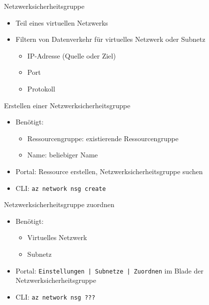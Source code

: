 
\begin{flashcard}[Definition]{Netzwerksicherheitsgruppe}
    \begin{itemize}
        \item Teil eines virtuellen Netzwerks
        \item Filtern von Datenverkehr für virtuelles Netzwerk oder Subnetz
        \begin{itemize}
            \item IP-Adresse (Quelle oder Ziel)
            \item Port
            \item Protokoll
        \end{itemize}
    \end{itemize}
\end{flashcard}

\begin{flashcard}[Definition]{Erstellen einer Netzwerksicherheitsgruppe}
    \begin{itemize}
        \item Benötigt:
            \begin{itemize}
                \item Ressourcengruppe: existierende Ressourcengruppe
                \item Name: beliebiger Name
            \end{itemize}
        \item Portal: Ressource erstellen, Netzwerksicherheitsgruppe suchen
        \item CLI: \texttt{az network nsg create}
    \end{itemize}
\end{flashcard}

\begin{flashcard}[Definition]{Netzwerksicherheitsgruppe zuordnen}
    \begin{itemize}
        \item Benötigt:
            \begin{itemize}
                \item Virtuelles Netzwerk
                \item Subnetz
            \end{itemize}
        \item Portal: \texttt{Einstellungen | Subnetze | Zuordnen} im Blade der Netzwerksicherheitsgruppe
        \item CLI: \texttt{az network nsg ???}
    \end{itemize}
\end{flashcard}

